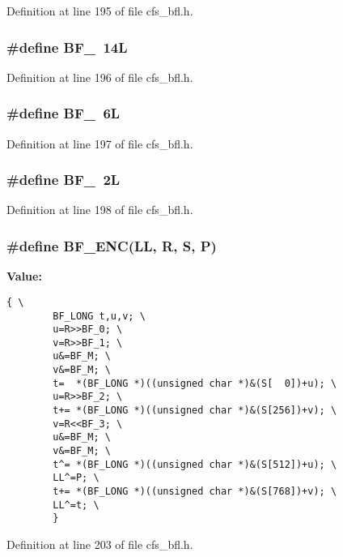 Definition at line 195 of file cfs\_\-bfl.h.
\subsubsection{\setlength{\rightskip}{0pt plus 5cm}\#define BF\_\ 14L}\label{cfs__bfl_8h_a11}




Definition at line 196 of file cfs\_\-bfl.h.
\subsubsection{\setlength{\rightskip}{0pt plus 5cm}\#define BF\_\ 6L}\label{cfs__bfl_8h_a12}




Definition at line 197 of file cfs\_\-bfl.h.
\subsubsection{\setlength{\rightskip}{0pt plus 5cm}\#define BF\_\ 2L}\label{cfs__bfl_8h_a13}




Definition at line 198 of file cfs\_\-bfl.h.
\subsubsection{\setlength{\rightskip}{0pt plus 5cm}\#define BF\_\-ENC(LL, R, S, P)}\label{cfs__bfl_8h_a14}


{\bf Value:}

\footnotesize\begin{verbatim}{ \
        BF_LONG t,u,v; \
        u=R>>BF_0; \
        v=R>>BF_1; \
        u&=BF_M; \
        v&=BF_M; \
        t=  *(BF_LONG *)((unsigned char *)&(S[  0])+u); \
        u=R>>BF_2; \
        t+= *(BF_LONG *)((unsigned char *)&(S[256])+v); \
        v=R<<BF_3; \
        u&=BF_M; \
        v&=BF_M; \
        t^= *(BF_LONG *)((unsigned char *)&(S[512])+u); \
        LL^=P; \
        t+= *(BF_LONG *)((unsigned char *)&(S[768])+v); \
        LL^=t; \
        }
\end{verbatim}\normalsize 


Definition at line 203 of file cfs\_\-bfl.h.

